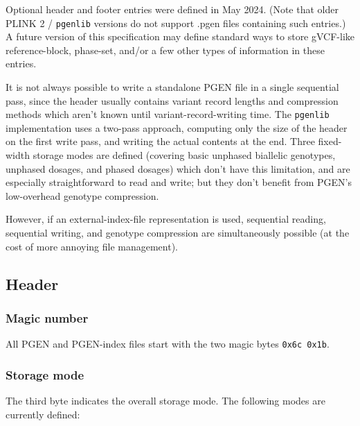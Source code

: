 \documentclass[8pt]{article}
\begin{document}
Optional header and footer entries were defined in May 2024.  (Note that older
PLINK 2 / \texttt{pgenlib} versions do not support .pgen files containing
such entries.)  A future version of this specification may define standard ways
to store gVCF-like reference-block, phase-set, and/or a few other types of
information in these entries.

It is not always possible to write a standalone PGEN file in a single
sequential pass, since the header usually contains variant record lengths and
compression methods which aren't known until variant-record-writing time.  The
\texttt{pgenlib} implementation uses a two-pass approach, computing only the
size of the header on the first write pass, and writing the actual contents at
the end.  Three fixed-width storage modes are defined (covering basic unphased
biallelic genotypes, unphased dosages, and phased dosages) which don't have
this limitation, and are especially straightforward to read and write; but they
don't benefit from PGEN's low-overhead genotype compression.

However, if an external-index-file representation is used, sequential reading,
sequential writing, and genotype compression are simultaneously possible (at
the cost of more annoying file management).

\subsection{Header}

\subsubsection{Magic number}

All PGEN and PGEN-index files start with the two magic bytes \texttt{0x6c
  0x1b}.

\subsubsection{Storage mode}

The third byte indicates the overall storage mode.  The following modes are
currently defined:
\end{document}
